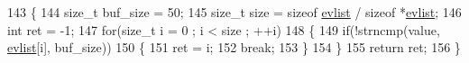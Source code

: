 \begin{DoxyCode}
143 \{
144     \textcolor{keywordtype}{size\_t} buf\_size = 50;
145     \textcolor{keywordtype}{size\_t} size = \textcolor{keyword}{sizeof} \hyperlink{hs-helper_8h_a0cd84b1a2184c9b84d1b7bf24582f28e}{evlist} / \textcolor{keyword}{sizeof} *\hyperlink{hs-helper_8h_a0cd84b1a2184c9b84d1b7bf24582f28e}{evlist};
146     \textcolor{keywordtype}{int} ret = -1;
147     \textcolor{keywordflow}{for}(\textcolor{keywordtype}{size\_t} i = 0 ; i < size ; ++i)
148     \{
149         \textcolor{keywordflow}{if}(!strncmp(value, \hyperlink{hs-helper_8h_a0cd84b1a2184c9b84d1b7bf24582f28e}{evlist}[i], buf\_size))
150         \{
151             ret = i;
152             \textcolor{keywordflow}{break};
153         \}
154     \}
155     \textcolor{keywordflow}{return} ret;
156 \}
\end{DoxyCode}
